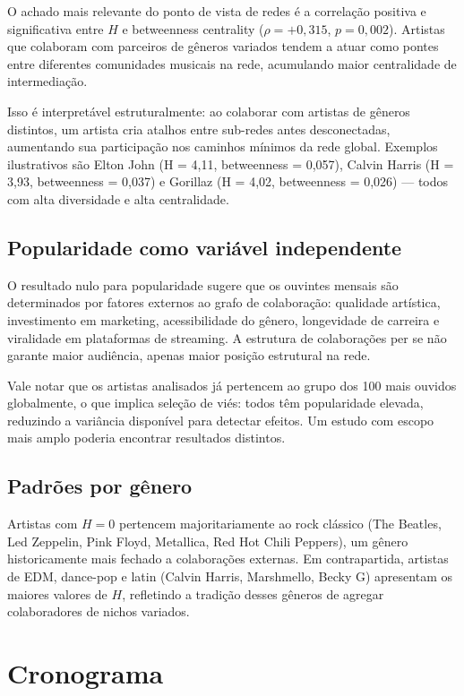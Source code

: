 \documentclass[12pt,a4paper]{article}
\begin{document}
O achado mais relevante do ponto de vista de redes é a correlação positiva e significativa entre $H$ e betweenness centrality ($\rho = +0{,}315$, $p = 0{,}002$). Artistas que colaboram com parceiros de gêneros variados tendem a atuar como pontes entre diferentes comunidades musicais na rede, acumulando maior centralidade de intermediação.

Isso é interpretável estruturalmente: ao colaborar com artistas de gêneros distintos, um artista cria atalhos entre sub-redes antes desconectadas, aumentando sua participação nos caminhos mínimos da rede global. Exemplos ilustrativos são Elton John (H = 4,11, betweenness = 0,057), Calvin Harris (H = 3,93, betweenness = 0,037) e Gorillaz (H = 4,02, betweenness = 0,026) — todos com alta diversidade e alta centralidade.

\subsection{Popularidade como variável independente}

O resultado nulo para popularidade sugere que os ouvintes mensais são determinados por fatores externos ao grafo de colaboração: qualidade artística, investimento em marketing, acessibilidade do gênero, longevidade de carreira e viralidade em plataformas de streaming. A estrutura de colaborações per se não garante maior audiência, apenas maior posição estrutural na rede.

Vale notar que os artistas analisados já pertencem ao grupo dos 100 mais ouvidos globalmente, o que implica seleção de viés: todos têm popularidade elevada, reduzindo a variância disponível para detectar efeitos. Um estudo com escopo mais amplo poderia encontrar resultados distintos.

\subsection{Padrões por gênero}

Artistas com $H = 0$ pertencem majoritariamente ao rock clássico (The Beatles, Led Zeppelin, Pink Floyd, Metallica, Red Hot Chili Peppers), um gênero historicamente mais fechado a colaborações externas. Em contrapartida, artistas de EDM, dance-pop e latin (Calvin Harris, Marshmello, Becky G) apresentam os maiores valores de $H$, refletindo a tradição desses gêneros de agregar colaboradores de nichos variados.

\section{Cronograma}
\end{document}
